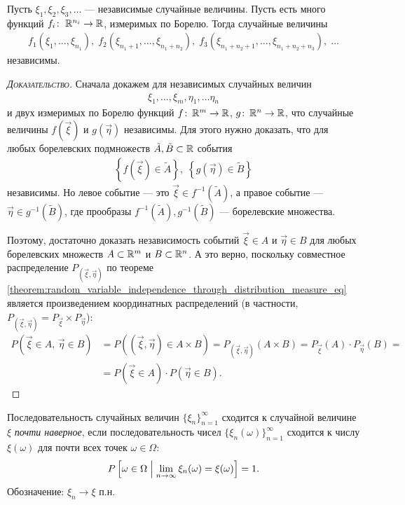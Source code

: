 \documentclass[../main.tex]{subfiles}
\begin{document}
\begin{thm}
 Пусть $ \xi_1, \xi_2, \xi_3, \ldots $ --- независимые случайные величины. Пусть есть много функций $ f_i \colon\;\mathbb{R}^{n_i} \to \mathbb{R} $, измеримых по Борелю. Тогда случайные величины
 \begin{align*}
  f_1(\xi_1, \ldots, \xi_{n_1}),\; f_2(\xi_{n_1 + 1}, \ldots, \xi_{n_1 + n_2}),\; f_3(\xi_{n_1 + n_2 + 1}, \ldots, \xi_{n_1 + n_2 + n_3}),\; \ldots
 \end{align*} независимы.
\end{thm}
\begin{proof}[\normalfont\textsc{Доказательство}]
 Сначала докажем для независимых случайных величин
 \begin{align*}
  \xi_1, \ldots, \xi_m, \eta_1, \ldots \eta_n
 \end{align*} и двух измеримых по Борелю функций $ f \colon\,\mathbb{R}^{m}\to\mathbb{R} $, $ g \colon\,\mathbb{R}^{n}\to\mathbb{R} $, что случайные величины $ f(\vec \xi) $ и $ g(\vec \eta) $ независимы. Для этого нужно доказать, что для любых борелевских подмножеств $ \tilde A, \tilde B \subset \mathbb{R} $ события
 \begin{align*}
  \left\{ f(\vec\xi) \in \tilde A \right\}, \; \left\{ g(\vec\eta)\in\tilde B \right\}
 \end{align*} независимы. Но левое событие --- это $ \vec\xi \in f^{-1}(\tilde A) $, а правое событие --- $ \vec\eta \in g^{-1}(\tilde B) $, где прообразы $ f^{-1}(\tilde A), g^{-1}(\tilde B) $ --- борелевские множества.

 Поэтому, достаточно доказать независимость событий $ \vec\xi \in A $ и $ \vec\eta \in B $ для любых борелевских множеств $ A \subset\mathbb{R}^{m} $ и $ B \subset \mathbb{R}^{n} $. А это верно, поскольку совместное распределение $ P_{(\vec\xi,\vec\eta)} $ по теореме \ref{theorem:random_variable_independence_through_distribution_measure_eq} является произведением координатных распределений (в частности, $ P_{(\vec\xi,\vec\eta)} = P_{\vec\xi} \times P_{\vec\eta} $):
 \begin{align*}
  P(\vec\xi \in A,\,\vec\eta\in B) &= P((\vec\xi, \vec\eta) \in A \times B) = P_{(\vec\xi,\vec\eta)}(A \times B) = P_{\vec\xi}(A) \cdot P_{\vec\eta}(B) = \\
 &= P(\vec\xi \in A) \cdot P(\vec\eta \in B).
 \end{align*}
\end{proof}

\begin{df}
 \label{def:converge_almost_everywhere}
 Последовательность случайных величин $ \{\xi_{n}\}_{n=1}^{\infty}  $ сходится к случайной величине $ \xi $  \textit{почти наверное}, если последовательность чисел $ \{\xi_{n}(\omega)\}_{n=1}^{\infty}  $  сходится к числу $ \xi(\omega) $ для почти всех точек $ \omega\in\Omega $:
 \begin{align*}
  P \left[ \omega\in\Omega\;\middle|\; \lim_{n \to \infty} \xi_n(\omega) = \xi(\omega) \right] = 1.
 \end{align*} Обозначение: $ \xi_n\to\xi $ п.н.
\end{df}
\end{document}
